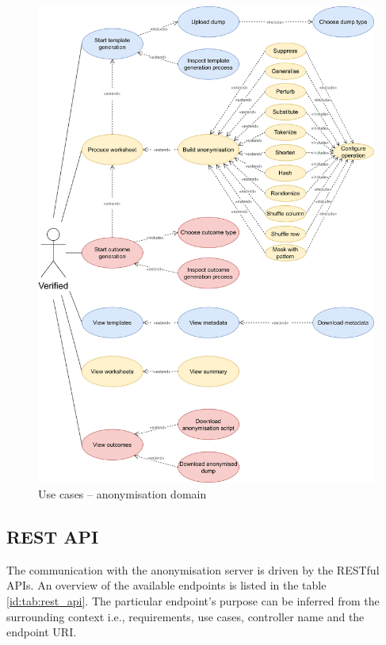 \documentclass[a4paper,twoside,12pt]{book}
\begin{document}
\begin{figure}
  \centering
  \includegraphics[width=\linewidth]{img/use_cases_anonymisation.png}
  \caption{Use cases – anonymisation domain}
  \label{fig:use_cases_anonymisation}
\end{figure}

\subsection{REST API}

The communication with the anonymisation server is driven by the RESTful APIs. An overview of the available endpoints is listed in the table \ref{id:tab:rest_api}. The particular endpoint's purpose can be inferred from the surrounding context i.e., requirements, use cases, controller name and the endpoint URI.
\end{document}
